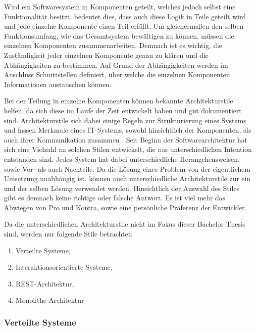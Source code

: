 Wird ein Softwaresystem in Komponenten geteilt, welches jedoch selbst eine Funktionalität besitzt, bedeutet dies, dass auch diese Logik in Teile geteilt wird und jede einzelne Komponente einen Teil erfüllt. Um gleichermaßen den selben Funktionsumfang, wie das Gesamtsystem bewältigen zu können, müssen die einzelnen Komponenten zusammenarbeiten. Demnach ist es wichtig, die Zuständigkeit jeder einzelnen Komponente genau zu klären und die Abhängigkeiten zu bestimmen. Auf Grund der Abhängigkeiten werden im Anschluss Schnittstellen definiert, über welche die einzelnen Komponenten Informationen austauschen können.

Bei der Teilung in einzelne Komponenten können bekannte Architekturstile helfen, da sich diese im Laufe der Zeit entwickelt haben und gut dokumentiert sind. Architekturstile sich dabei einige Regeln zur Strukturierung eines Systems und fassen Merkmale eines IT-Systems, sowohl hinsichtlich der Komponenten, als auch ihrer Kommunikation zusammen \parencite[vlg.][S. 102]{starke_effektive_2015}. Seit Beginn der Softwarearchitektur hat sich eine Vielzahl an solchen Stilen entwickelt, die aus unterschiedlichen Intention entstanden sind. Jedes System hat dabei unterschiedliche Herangehensweisen, sowie Vor- als auch Nachteile. Da die Lösung eines Problem von der eigentlichem Umsetzung unabhängig ist, können auch unterschiedliche Architekturstile zur ein und der selben Lösung verwendet werden. Hinsichtlich der Auswahl des Stiles gibt es demnach keine richtige oder falsche Antwort. Es ist viel mehr das Abwiegen von Pro und Kontra, sowie eine persönliche Präferenz der Entwickler.

Da die unterschiedlichen Architekturstile nicht im  Fokus dieser Bachelor Thesis sind, werden nur folgende Stile betrachtet:

\begin{enumerate}
	\item Verteilte Systeme,
	\item Interaktionsorientierte Systeme,
	\item REST-Architektur,
	\item Monolithe Architektur
\end{enumerate}

\subsubsection{Verteilte Systeme}

